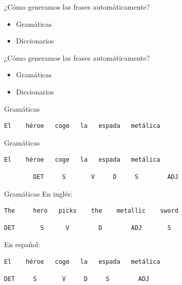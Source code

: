 
\begin{tframe}{¿Cómo generamos las frases automáticamente?}
	\begin{itemize}
		\item Gramáticas
		\item Diccionarios
	\end{itemize}
\end{tframe}

\begin{tframe}{¿Cómo generamos las frases automáticamente?}
	\begin{itemize}
		\item<+-| alert@+> Gramáticas
		\item Diccionarios
	\end{itemize}
\end{tframe}

\begin{frame}[t, fragile]{Gramáticas}
	\vspace*{\fill}
	\begin{Verbatim}
El    héroe   coge   la   espada   metálica
	\end{Verbatim}
	\vspace*{\fill}
\end{frame}

\begin{frame}[t, fragile]{Gramáticas}
	\vspace*{\fill}
	\begin{Verbatim}
El    héroe   coge   la   espada   metálica
	\end{Verbatim}
	\begin{verbatim}
		DET     S       V     D     S        ADJ
	\end{verbatim}
	\vspace*{\fill}
\end{frame}

\begin{frame}[t, fragile]{Gramáticas}
En inglés:

	\begin{Verbatim}
The     hero   picks    the    metallic    sword
	\end{Verbatim}
	\begin{Verbatim}
DET       S      V        D        ADJ       S
	\end{Verbatim}
\vspace*{12px}
En español:
	\begin{Verbatim}
El    héroe   coge   la   espada   metálica
	\end{Verbatim}
	\begin{Verbatim}
DET     S       V     D     S        ADJ
	\end{Verbatim}
\end{frame}

